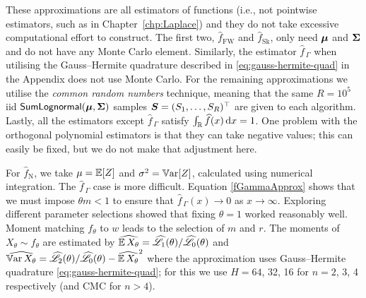 These approximations are all estimators of functions (i.e., not pointwise estimators, such as in Chapter~\ref{chp:Laplace}) and they do not take excessive computational effort to construct. The first two, $\widehat{f}_{\mathrm{FW}}$ and $\widehat{f}_{\mathrm{Sk}}$, only need $\bm{\mu}$ and $\bm{\Sigma}$ and do not have any Monte Carlo element. Similarly, the estimator $\widehat{f}_{\,\Gamma}$ when utilising the Gauss--Hermite quadrature described in \eqref{eq:gauss-hermite-quad}
in the Appendix does not use Monte Carlo. For the remaining approximations we utilise the \emph{common random numbers} technique, meaning that the same $R=10^5$ iid $\mathsf{SumLognormal}(\bm{\mu}, \bm{\Sigma})$ samples $\bm{S} = (S_1, \dots, S_R)^\top$ are given to each algorithm. Lastly, all the estimators except $\widehat{f}_{\,\Gamma}$ satisfy $\int_{\mathbb{R}} \widehat{f}(x) \mathop{}\!\mathrm{d} x = 1$. One problem with the orthogonal polynomial estimators is that they can take negative values; this can easily be fixed, but we do not make that adjustment here.



For $\widehat{f}_{\mathrm{N}}$, we take $\mu = \operatorname{{\mathbb E}}[Z]$ and $\sigma^2 = \operatorname{\mathbb{V}\mathrm{ar}}[Z]$, calculated using numerical integration.
The $\widehat{f}_{\,\Gamma}$ case is more difficult. Equation \eqref{fGammaApprox} shows that we must impose $\theta m < 1$ to ensure that $\widehat{f}_{\,\Gamma}(x)\to 0$ as $x\to \infty$.
Exploring different parameter selections showed that fixing $\theta = 1$ worked reasonably well. Moment matching $f_\theta$ to $w$ leads to the selection of $m$ and $r$. The moments of $X_\theta \sim f_\theta$ are estimated by
$ \widehat{\operatorname{{\mathbb E}} X_\theta} = \widehat{\mathscr{L}}_1(\theta) / \widehat{\mathscr{L}}_0(\theta)$  and
 $\widehat{\operatorname{\mathbb{V}\mathrm{ar}} X_\theta} = \widehat{\mathscr{L}}_2(\theta) / \widehat{\mathscr{L}}_0(\theta) - \widehat{\operatorname{{\mathbb E}} X_\theta}^2  $ where the approximation uses Gauss--Hermite quadrature \eqref{eq:gauss-hermite-quad}; for this we use $H = 64$, 32, 16 for $n=2$, 3, 4 respectively (and CMC for $n > 4$).

